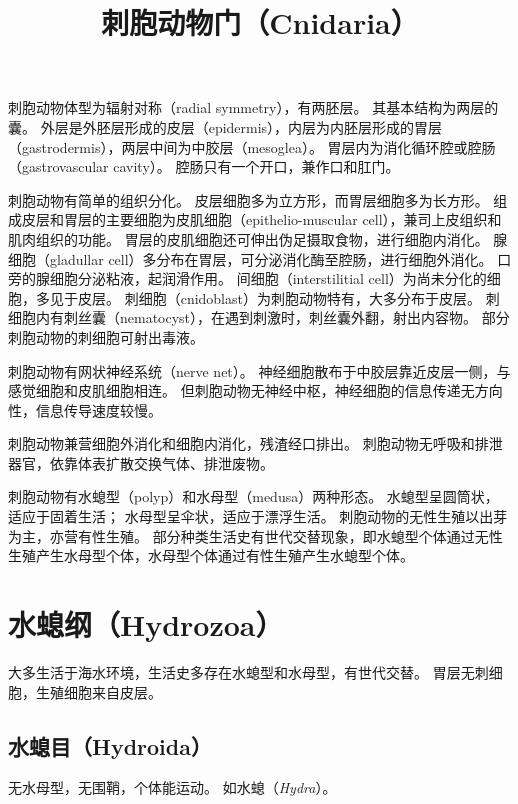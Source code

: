 \documentclass[11pt]{article}
\title{刺胞动物门（Cnidaria）}
\date{}
\begin{document}
  \maketitle

  \linenumbers
刺胞动物体型为辐射对称（radial symmetry），有两胚层。
其基本结构为两层的囊。
外层是外胚层形成的皮层（epidermis），内层为内胚层形成的胃层（gastrodermis），两层中间为中胶层（mesoglea）。
胃层内为消化循环腔或腔肠（gastrovascular cavity）。
腔肠只有一个开口，兼作口和肛门。

\newline

刺胞动物有简单的组织分化。
皮层细胞多为立方形，而胃层细胞多为长方形。
组成皮层和胃层的主要细胞为皮肌细胞（epithelio-muscular cell），兼司上皮组织和肌肉组织的功能。
胃层的皮肌细胞还可伸出伪足摄取食物，进行细胞内消化。
腺细胞（gladullar cell）多分布在胃层，可分泌消化酶至腔肠，进行细胞外消化。
口旁的腺细胞分泌粘液，起润滑作用。
间细胞（interstilitial cell）为尚未分化的细胞，多见于皮层。
刺细胞（cnidoblast）为刺胞动物特有，大多分布于皮层。
刺细胞内有刺丝囊（nematocyst），在遇到刺激时，刺丝囊外翻，射出内容物。
部分刺胞动物的刺细胞可射出毒液。

\newline

刺胞动物有网状神经系统（nerve net）。
神经细胞散布于中胶层靠近皮层一侧，与感觉细胞和皮肌细胞相连。
但刺胞动物无神经中枢，神经细胞的信息传递无方向性，信息传导速度较慢。

\newline

刺胞动物兼营细胞外消化和细胞内消化，残渣经口排出。
刺胞动物无呼吸和排泄器官，依靠体表扩散交换气体、排泄废物。

\newline

刺胞动物有水螅型（polyp）和水母型（medusa）两种形态。
水螅型呈圆筒状，适应于固着生活；
水母型呈伞状，适应于漂浮生活。
刺胞动物的无性生殖以出芽为主，亦营有性生殖。
部分种类生活史有世代交替现象，即水螅型个体通过无性生殖产生水母型个体，水母型个体通过有性生殖产生水螅型个体。
  
\section{水螅纲（Hydrozoa）}
大多生活于海水环境，生活史多存在水螅型和水母型，有世代交替。
胃层无刺细胞，生殖细胞来自皮层。

\subsection{水螅目（Hydroida）}
无水母型，无围鞘，个体能运动。
如水螅（\textit{Hydra}）。
\end{document}
